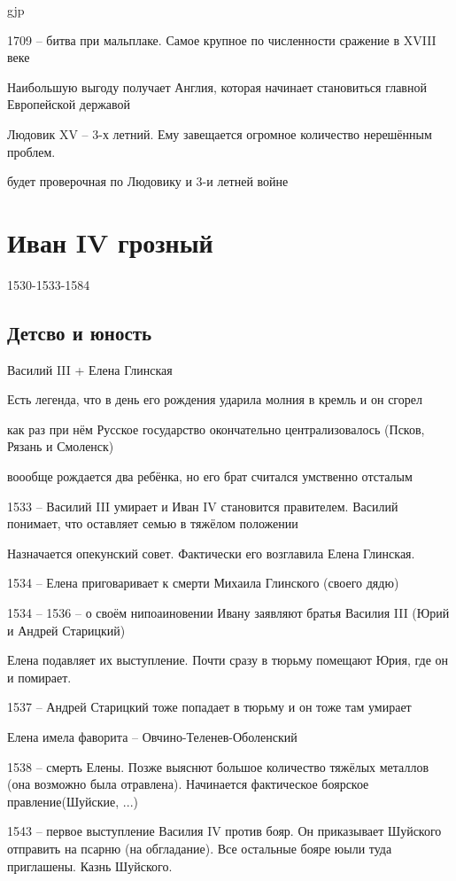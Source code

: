 gjp	 \documentclass[12pt,a4paper]{article}
\begin{document}
1709 -- битва при мальплаке. Самое крупное по численности сражение в XVIII веке

Наибольшую выгоду получает Англия, которая начинает становиться главной Европейской державой

Людовик XV -- 3-х летний. Ему завещается огромное количество нерешённым проблем.

будет проверочная по Людовику и 3-и летней войне

\section{Иван IV грозный}

1530-1533-1584

\subsection{Детсво и юность}
Василий III + Елена Глинская

Есть легенда, что в день его рождения ударила молния в кремль и он сгорел

как раз при нём Русское государство окончательно централизовалось (Псков, Рязань и Смоленск)

воообще рождается два ребёнка, но его брат считался умственно отсталым

1533 -- Василий III умирает и Иван IV становится правителем. Василий понимает, что оставляет семью в тяжёлом положении

Назначается опекунский совет. Фактически его возглавила Елена Глинская.

1534 -- Елена приговаривает к смерти Михаила Глинского (своего дядю)

1534 -- 1536 -- о своём нипоаиновении Ивану заявляют братья Василия III (Юрий и Андрей Старицкий)

Елена подавляет их выступление. Почти сразу в тюрьму помещают Юрия, где он и помирает.

1537 -- Андрей Старицкий тоже попадает в тюрьму и он тоже там умирает

Елена имела фаворита -- Овчино-Теленев-Оболенский


1538 -- смерть Елены. Позже выяснют большое количество тяжёлых металлов (она возможно была отравлена). Начинается фактическое боярское правление(Шуйские, ...)

1543 -- первое выступление Василия IV против бояр. Он приказывает Шуйского отправить на псарню (на обгладание). Все остальные бояре юыли туда приглашены. Казнь Шуйского.
\end{document}
